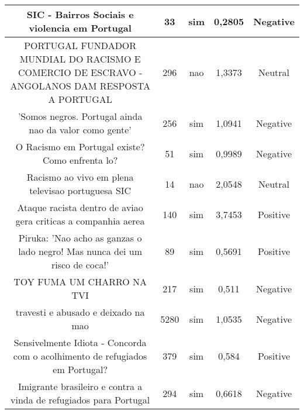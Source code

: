 \documentclass[11pt]{article}
\newlength\mylength
\begin{document}
\begin{center}
\begin{longtable}{||C{.40\mylength}||C{.20\mylength}||C{.20\mylength}||C{.30\mylength}||C{.20\mylength}||}
   SIC - Bairros Sociais e violencia em Portugal  & 33 & sim & 0,2805 & Negative \\  \hline
   PORTUGAL FUNDADOR MUNDIAL DO RACISMO E COMERCIO DE ESCRAVO -ANGOLANOS DAM RESPOSTA A PORTUGAL  & 296 & nao & 1,3373 & Neutral \\  \hline
   'Somos negros. Portugal ainda nao da valor como gente'  & 256 & sim & 1,0941 & Negative \\  \hline
   O Racismo em Portugal existe? Como enfrenta lo?  & 51 & sim & 0,9989 & Negative \\  \hline
   Racismo ao vivo em plena televisao portuguesa SIC  & 14 & nao & 2,0548 & Neutral \\  \hline
   Ataque racista dentro de aviao gera criticas a companhia aerea  & 140 & sim & 3,7453 & Positive \\  \hline
   Piruka: 'Nao acho as ganzas o lado negro! Mas nunca dei um risco de coca!'  & 89 & sim & 0,5691 & Positive \\  \hline
   TOY FUMA UM CHARRO NA TVI  & 217 & sim & 0,511 & Negative \\  \hline
   travesti e abusado e deixado na mao  & 5280 & sim & 1,0535 & Negative \\  \hline
   Sensivelmente Idiota - Concorda com o acolhimento de refugiados em Portugal?  & 379 & sim & 0,584 & Positive \\  \hline
   Imigrante brasileiro e contra a vinda de refugiados para Portugal  & 294 & sim & 0,6618 & Negative \\  \hline

\end{longtable}
\end{center}
\end{document}
